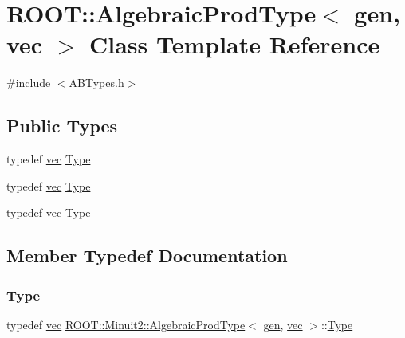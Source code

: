 \hypertarget{classROOT_1_1Minuit2_1_1AlgebraicProdType_3_01gen_00_01vec_01_4}{}\section{R\+O\+OT\+:\+:Algebraic\+Prod\+Type$<$ gen, vec $>$ Class Template Reference}
\label{classROOT_1_1Minuit2_1_1AlgebraicProdType_3_01gen_00_01vec_01_4}


{\ttfamily \#include $<$A\+B\+Types.\+h$>$}

\subsection*{Public Types}
\begin{DoxyCompactItemize}
\item 
typedef \mbox{\hyperlink{classROOT_1_1Minuit2_1_1vec}{vec}} \mbox{\hyperlink{classROOT_1_1Minuit2_1_1AlgebraicProdType_3_01gen_00_01vec_01_4_aea7f5057aa02e4473fef4887b06d4f71}{Type}}
\item 
typedef \mbox{\hyperlink{classROOT_1_1Minuit2_1_1vec}{vec}} \mbox{\hyperlink{classROOT_1_1Minuit2_1_1AlgebraicProdType_3_01gen_00_01vec_01_4_aea7f5057aa02e4473fef4887b06d4f71}{Type}}
\item 
typedef \mbox{\hyperlink{classROOT_1_1Minuit2_1_1vec}{vec}} \mbox{\hyperlink{classROOT_1_1Minuit2_1_1AlgebraicProdType_3_01gen_00_01vec_01_4_aea7f5057aa02e4473fef4887b06d4f71}{Type}}
\end{DoxyCompactItemize}


\subsection{Member Typedef Documentation}
\mbox{\label{classROOT_1_1Minuit2_1_1AlgebraicProdType_3_01gen_00_01vec_01_4_aea7f5057aa02e4473fef4887b06d4f71}} 
\subsubsection{\texorpdfstring{Type}{Type}\hspace{0.1cm}{\footnotesize\ttfamily [1/3]}}
{\footnotesize\ttfamily typedef \mbox{\hyperlink{classROOT_1_1Minuit2_1_1vec}{vec}} \mbox{\hyperlink{classROOT_1_1Minuit2_1_1AlgebraicProdType}{R\+O\+O\+T\+::\+Minuit2\+::\+Algebraic\+Prod\+Type}}$<$ \mbox{\hyperlink{classROOT_1_1Minuit2_1_1gen}{gen}}, \mbox{\hyperlink{classROOT_1_1Minuit2_1_1vec}{vec}} $>$\+::\mbox{\hyperlink{classROOT_1_1Minuit2_1_1AlgebraicProdType_3_01gen_00_01vec_01_4_aea7f5057aa02e4473fef4887b06d4f71}{Type}}}

